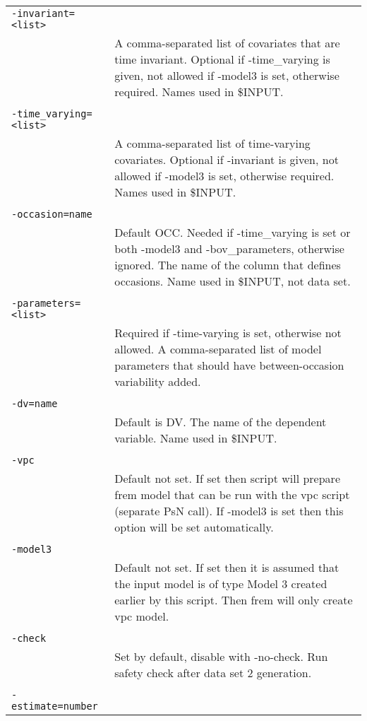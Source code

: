 \documentclass[a4paper,12pt]{article}
\begin{document}
\begin{longtable}{p{1in}p{4in}}
\verb|-invariant=<list>| & \\
\nopagebreak
 & A comma-separated list of covariates that are time invariant. Optional if -time\_varying is given, not allowed if -model3 is set, otherwise required. Names used in \$INPUT. \\
\\
\verb|-time_varying=<list>| & \\
\nopagebreak
 & A comma-separated list of time-varying covariates. Optional if -invariant is given, not allowed if -model3 is set, otherwise required. Names used in \$INPUT. \\
\\
\verb|-occasion=name| & \\
\nopagebreak
 & Default OCC. Needed if -time\_varying is set or both -model3 and -bov\_parameters, otherwise ignored. The name of the column that defines occasions. Name used in \$INPUT, not data set. \\
\\
\verb|-parameters=<list>| & \\
\nopagebreak
 & Required if -time-varying is set, otherwise not allowed. A comma-separated list of model parameters that should have between-occasion variability added. \\
\\
\verb|-dv=name| & \\
\nopagebreak
 & Default is DV. The name of the dependent variable. Name used in \$INPUT. \\
\\
\verb|-vpc| & \\
\nopagebreak
 & Default not set. If set then script will prepare frem model that can be run with the vpc script (separate PsN call). If -model3 is set then this option will be set automatically.  \\
\\
\verb|-model3| & \\
\nopagebreak
 & Default not set. If set then it is assumed that the input model is of type Model 3 created earlier by this script. Then frem will only create vpc model.  \\
\\
\verb|-check| & \\
\nopagebreak
 & Set by default, disable with -no-check. Run safety check after data set 2 generation. \\
\\
\verb|-estimate=number| & \\

\end{longtable}
\end{document}
